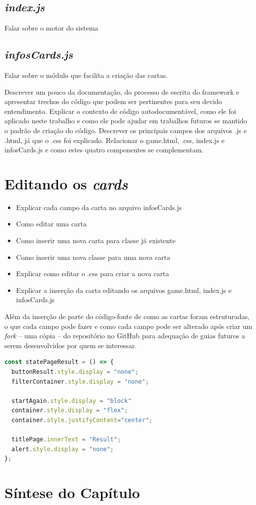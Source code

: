 \subsection{\textit{index.js}}
Falar sobre o motor do sistema

\subsection{\textit{infosCards.js}}
Falar sobre o módulo que facilita a criação das cartas.


Descrever um pouco da documentação, do processo de escrita do framework e apresentar trechos do código que podem ser pertinentes para seu devido entendimento. Explicar o contexto de código autodocumentável, como ele foi aplicado neste trabalho e como ele pode ajudar em trabalhos futuros se mantido o padrão de criação do código. Descrever os principais campos dos arquivos .js e .html, já que o .css foi explicado. Relacionar o game.html, .css, index.js e infosCards.js e como estes quatro componentes se complementam.

\section{Editando os \textit{cards}}
\label{editandocards}

\begin{itemize}
    \item Explicar cada campo da carta no arquivo infosCards.js
    \item Como editar uma carta
    \item Como inserir uma nova carta para classe já existente
    \item Como inserir uma nova classe para uma nova carta
     \item Explicar como editar o .css para criar a nova carta
    \item Explicar a inserção da carta editando os arquivos game.html, index.js e infosCards.js
\end{itemize}

Além da inserção de parte do código-fonte de como as cartas foram estruturadas, o que cada campo pode fazer e como cada campo pode ser alterado após criar um \textit{fork} -- uma cópia -- do repositório no GitHub para adequação de guias futuros a serem desenvolvidos por quem se interessar.


\begin{lstlisting}[language=JavaScript, caption=JavaScript example]
const statePageResult = () => {
  buttonResult.style.display = "none";
  filterContainer.style.display = "none";

  startAgain.style.display = "block"
  container.style.display = "flex";
  container.style.justifyContent="center";

  titlePage.innerText = "Result";
  alert.style.display = "none";
};
\end{lstlisting}


\section{Síntese do Capítulo}